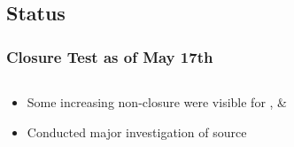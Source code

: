 \documentclass{beamer}
\begin{document}
\subsection{Status}
\begin{frame}
 \frametitle{Closure Test as of May 17th}
 \begin{columns}
  \begin{column}{0.33\textwidth}
  \begin{itemize}
   \item Some increasing non-closure were visible for \HT, \MHT \& \NJets
   \item Conducted major investigation of source
  \end{itemize}

  \end{column}
  \begin{column}{0.33\textwidth}
   \begin{tikzpicture}

\end{tikzpicture}
\end{column}
\end{columns}
\end{frame}
\end{document}
